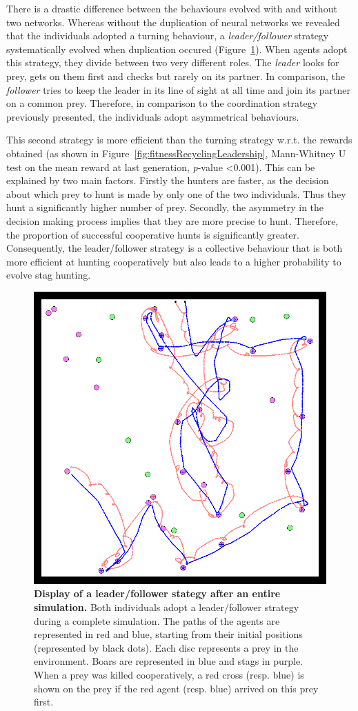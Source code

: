     There is a drastic difference between the behaviours evolved with and without two networks. Whereas without the duplication of neural networks we revealed that the individuals adopted a turning behaviour, a \emph{leader/follower} strategy systematically evolved when duplication occured (Figure~\ref{fig:figLeadershipBehaviour}). When agents adopt this strategy, they divide between two very different roles. The \emph{leader} looks for prey, gets on them first and checks but rarely on its partner. In comparison, the \emph{follower} tries to keep the leader in its line of sight at all time and join its partner on a common prey. Therefore, in comparison to the coordination strategy previously presented, the individuals adopt asymmetrical behaviours. 

    This second strategy is more efficient than the turning strategy w.r.t. the rewards obtained (as shown in Figure~\ref{fig:fitnessRecyclingLeadership}, Mann-Whitney U test on the mean reward at last generation, {\em p}-value \textless 0.001). This can be explained by two main factors. Firstly the hunters are faster, as the decision about which prey to hunt is made by only one of the two individuals. Thus they hunt a significantly higher number of prey. Secondly, the asymmetry in the decision making process implies that they are more precise to hunt. Therefore, the proportion of successful cooperative hunts is significantly greater. Consequently, the leader/follower strategy is a collective behaviour that is both more efficient at hunting cooperatively but also leads to a higher probability to evolve stag hunting.

    \begin{figure}[h]
      \centering
        \includegraphics[width=0.5\linewidth]{fig/ArticleBio2/Fig5.png}
        \caption{\textbf{Display of a leader/follower stategy after an entire simulation.}
        Both individuals adopt a leader/follower strategy during a complete simulation. The paths of the agents are represented in red and blue, starting from their initial positions (represented by black dots). Each disc represents a prey in the environment. Boars are represented in blue and stags in purple. When a prey was killed cooperatively, a red cross (resp. blue) is shown on the prey if the red agent (resp. blue) arrived on this prey first.}
      \label{fig:figLeadershipBehaviour}
    \end{figure}

